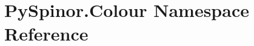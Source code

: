 \hypertarget{namespace_py_spinor_1_1_colour}{}\section{Py\+Spinor.\+Colour Namespace Reference}
\label{namespace_py_spinor_1_1_colour}
